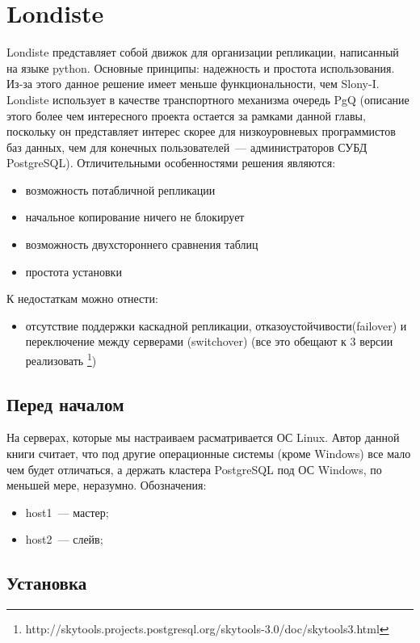 \section{Londiste}
Londiste представляет собой движок для организации репликации, написанный на языке python. 
Основные принципы: надежность и простота использования. Из-за этого данное решение имеет меньше функциональности, 
чем Slony-I. Londiste использует в качестве транспортного механизма очередь PgQ  (описание этого более чем интересного 
проекта остается за рамками данной главы, поскольку он представляет интерес скорее для низкоуровневых программистов 
баз данных, чем для конечных пользователей~--- администраторов СУБД PostgreSQL). Отличительными особенностями решения являются:
\begin{itemize}
\item возможность потабличной репликации
\item начальное копирование ничего не блокирует
\item возможность двухстороннего сравнения таблиц
\item простота установки
\end{itemize}

К недостаткам можно отнести:
\begin{itemize}
\item отсутствие поддержки каскадной репликации, отказоустойчивости(failover) и переключение между 
серверами (switchover) (все это обещают к 3 версии реализовать
\footnote{http://skytools.projects.postgresql.org/skytools-3.0/doc/skytools3.html})
\end{itemize}

\subsection{Перед началом}
На серверах, которые мы настраиваем расматривается ОС Linux. 
Автор данной книги считает, что под другие операционные системы (кроме Windows) все мало чем будет отличаться, 
а держать кластера PostgreSQL под ОС Windows, по меньшей мере, неразумно.
Обозначения: 
\begin{itemize}
\item host1~--- мастер; 
\item host2~--- слейв;
\end{itemize}

\subsection{Установка}


